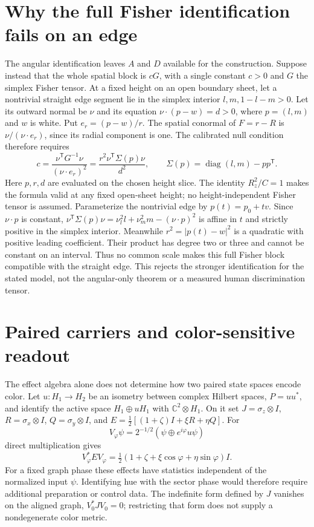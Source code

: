 \documentclass[11pt,letterpaper]{article}
\theoremstyle{plain}
\begin{document}
\section{Why the full Fisher identification fails on an edge}
\label{app:full-fisher}
The angular identification leaves $A$ and $D$ available for the construction. Suppose instead that the whole spatial block is $cG$, with a single constant $c>0$ and $G$ the simplex Fisher tensor. At a fixed height on an open boundary sheet, let a nontrivial straight edge segment lie in the simplex interior $l,m,1-l-m>0$. Let its outward normal be $\nu$ and its equation $\nu\cdot(p-w)=d>0$, where $p=(l,m)$ and $w$ is white. Put $e_r=(p-w)/r$. The spatial conormal of $F=r-R$ is $\nu/(\nu\cdot e_r)$, since its radial component is one. The calibrated null condition therefore requires
\begin{equation}
 c=\frac{\nu^\mathsf{T}G^{-1}\nu}{(\nu\cdot e_r)^2}
   =\frac{r^2\nu^\mathsf{T}\Sigma(p)\nu}{d^2},\qquad
 \Sigma(p)=\operatorname{diag}(l,m)-pp^\mathsf{T}.
 \label{eq:full-fisher-edge}
\end{equation}
Here $p,r,d$ are evaluated on the chosen height slice. The identity $R_z^2/C=1$ makes the formula valid at any fixed open-sheet height; no height-independent Fisher tensor is assumed.
Parameterize the nontrivial edge by $p(t)=p_0+tv$. Since $\nu\cdot p$ is constant, $\nu^\mathsf{T}\Sigma(p)\nu=\nu_l^2l+\nu_m^2m-(\nu\cdot p)^2$ is affine in $t$ and strictly positive in the simplex interior. Meanwhile $r^2=|p(t)-w|^2$ is a quadratic with positive leading coefficient. Their product has degree two or three and cannot be constant on an interval. Thus no common scale makes this full Fisher block compatible with the straight edge. This rejects the stronger identification for the stated model, not the angular-only theorem or a measured human discrimination tensor.

\section{Paired carriers and color-sensitive readout}
\label{app:paired-readout}
The effect algebra alone does not determine how two paired state spaces encode color. Let $u:H_1\to H_2$ be an isometry between complex Hilbert spaces, $P=uu^*$, and identify the active space $H_1\oplus uH_1$ with $\mathbb C^2\otimes H_1$. On it set $J=\sigma_z\otimes I$, $R=\sigma_x\otimes I$, $Q=\sigma_y\otimes I$, and $E=\tfrac12[(1+\zeta)I+\xi R+\eta Q]$. For
\begin{equation}
 V_\varphi\psi=2^{-1/2}(\psi\oplus e^{i\varphi}u\psi)
 \label{eq:paired-graph}
\end{equation}
direct multiplication gives
\begin{equation}
 V_\varphi^*EV_\varphi
 =\tfrac12(1+\zeta+\xi\cos\varphi+\eta\sin\varphi)I.
 \label{eq:paired-phase-statistics}
\end{equation}
For a fixed graph phase these effects have statistics independent of the normalized input $\psi$. Identifying hue with the sector phase would therefore require additional preparation or control data. The indefinite form defined by $J$ vanishes on the aligned graph, $V_0^*JV_0=0$; restricting that form does not supply a nondegenerate color metric.
\end{document}
